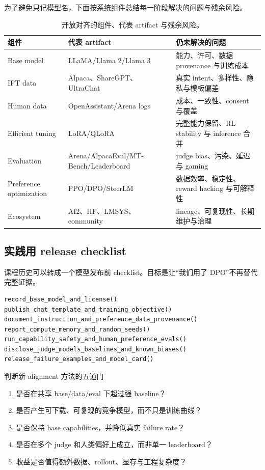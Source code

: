 为了避免只记模型名，下面按系统组件总结每一阶段解决的问题与残余风险。

\begin{table}[H]
\centering
\small
\begin{tabularx}{\textwidth}{L{0.16\textwidth} L{0.22\textwidth} X}
\toprule
组件 & 代表 artifact & 仍未解决的问题 \\
\midrule
Base model & LLaMA/Llama 2/Llama 3 & 能力、许可、数据 provenance 与训练成本 \\
IFT data & Alpaca、ShareGPT、UltraChat & 真实 intent、多样性、隐私与模板偏差 \\
Human data & OpenAssistant/Arena logs & 成本、一致性、consent 与覆盖 \\
Efficient tuning & LoRA/QLoRA & 完整能力保留、RL stability 与 inference 合并 \\
Evaluation & Arena/AlpacaEval/MT-Bench/Leaderboard & judge bias、污染、延迟与 gaming \\
Preference optimization & PPO/DPO/SteerLM & 数据效率、稳定性、reward hacking 与可解释性 \\
Ecosystem & AI2、HF、LMSYS、community & lineage、可复现性、长期维护与治理 \\
\bottomrule
\end{tabularx}
\caption{开放对齐的组件、代表 artifact 与残余风险。}
\end{table}

\subsection{实践用 release checklist}

课程历史可以转成一个模型发布前 checklist。目标是让“我们用了 DPO”不再替代完整证据。

\begin{lstlisting}[caption={Open aligned model release checklist}]
record_base_model_and_license()
publish_chat_template_and_training_objective()
document_instruction_and_preference_data_provenance()
report_compute_memory_and_random_seeds()
run_capability_safety_and_human_preference_evals()
disclose_judge_models_baselines_and_known_biases()
release_failure_examples_and_model_card()
\end{lstlisting}

\begin{importantbox}{判断新 alignment 方法的五道门}
\begin{enumerate}
  \item 是否在共享 base/data/eval 下超过强 baseline？
  \item 是否产生可下载、可复现的竞争模型，而不只是训练曲线？
  \item 是否保持 base capabilities，并降低真实 failure rate？
  \item 是否在多个 judge 和人类偏好上成立，而非单一 leaderboard？
  \item 收益是否值得额外数据、rollout、显存与工程复杂度？
\end{enumerate}
\end{importantbox}

